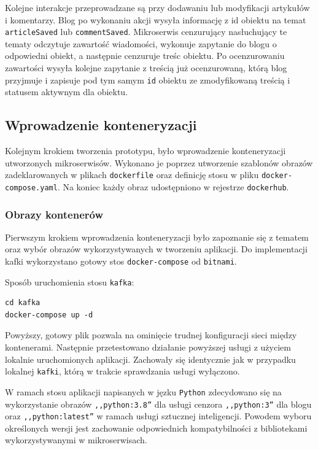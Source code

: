 \documentclass[12pt,twoside]{article}
\begin{document}
Kolejne interakcje przeprowadzane są przy dodawaniu lub modyfikacji artykułów i komentarzy. Blog po wykonaniu akcji wysyła informację z id obiektu na temat \texttt{articleSaved} lub \texttt{commentSaved}. Mikroserwis cenzurujący nasłuchujący te tematy odczytuje zawartość wiadomości, wykonuje zapytanie do blogu o odpowiedni obiekt, a następnie cenzuruje treśc obiektu. Po ocenzurowaniu zawartości wysyła kolejne zapytanie z treścią już ocenzurowaną, którą blog przyjmuje i zapisuje pod tym samym \texttt{id} obiektu ze zmodyfikowaną treścią i statusem aktywnym dla obiektu.

\subsection{Wprowadzenie konteneryzacji}
Kolejnym krokiem tworzenia prototypu, było wprowadzenie konteneryzacji utworzonych mikroserwisów. Wykonano je poprzez utworzenie szablonów obrazów zadeklarowanych w plikach \texttt{dockerfile} oraz definicję stosu w pliku \texttt{docker-compose.yaml}. Na koniec każdy obraz udostępniono w rejestrze \texttt{dockerhub}\cite{myhub}.

\subsubsection{Obrazy kontenerów}
Pierwszym krokiem wprowadzenia konteneryzacji było zapoznanie się z tematem oraz wybór obrazów wykorzystywanych w tworzeniu aplikacji. Do implementacji kafki wykorzystano gotowy stos \texttt{docker-compose} od \texttt{bitnami}\cite{bitnami}.

Sposób uruchomienia stosu \texttt{kafka}:
\begin{lstlisting}[breaklines]
cd kafka
docker-compose up -d
\end{lstlisting}
Powyższy, gotowy plik pozwala na ominięcie trudnej konfiguracji sieci między kontenerami. Następnie przetestowano działanie powyższej usługi z użyciem lokalnie uruchomionych aplikacji. Zachowały się identycznie jak w przypadku lokalnej \texttt{kafki},  którą w trakcie sprawdzania usługi wyłączono.

W ramach stosu aplikacji napisanych w jęzku \texttt{Python} zdecydowano się na wykorzystanie obrazów \texttt{,,python:3.8''} dla usługi cenzora \texttt{,,python:3''} dla blogu oraz \texttt{,,python:latest''} w ramach usługi sztucznej inteligencji. Powodem wyboru określonych wersji jest zachowanie odpowiednich kompatybilności z bibliotekami wykorzystywanymi w mikroserwisach.
\end{document}
